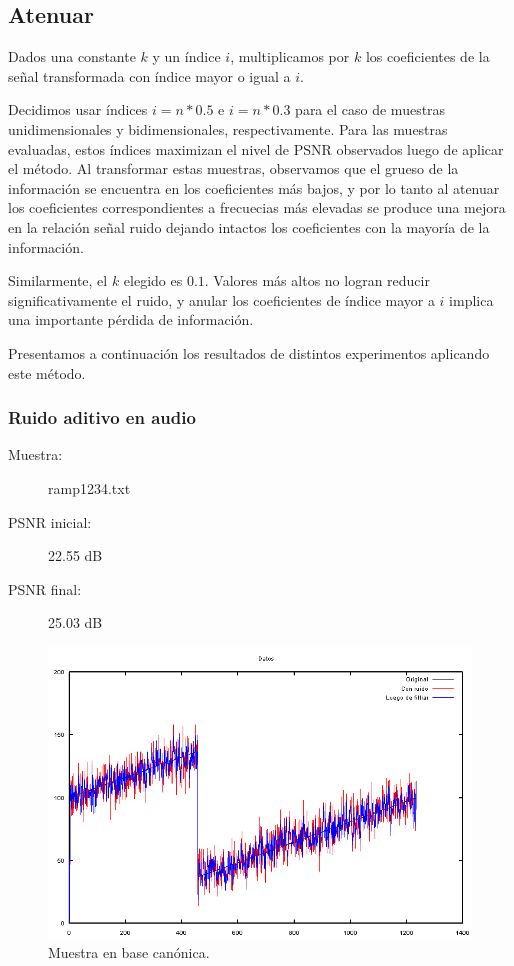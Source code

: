 \documentclass[a4paper,10pt,twoside]{article}
\begin{document}
\subsection{Atenuar}

Dados una constante $k$ y un índice $i$, multiplicamos por $k$ los coeficientes de la señal transformada con índice mayor o igual a $i$.

Decidimos usar índices $i = n * 0.5$ e $i = n * 0.3$ para el caso de muestras unidimensionales y bidimensionales, respectivamente. Para las muestras evaluadas, estos índices maximizan el nivel de PSNR observados luego de aplicar el método. Al transformar estas muestras, observamos que el grueso de la información se encuentra en los coeficientes más bajos, y por lo tanto al atenuar los coeficientes correspondientes a frecuecias más elevadas se produce una mejora en la relación señal ruido dejando intactos los coeficientes con la mayoría de la información.

Similarmente, el $k$ elegido es $0.1$. Valores más altos no logran reducir significativamente el ruido, y anular los coeficientes de índice mayor a $i$ implica una importante pérdida de información.

Presentamos a continuación los resultados de distintos experimentos aplicando este método.

\subsubsection{Ruido aditivo en audio}

\begin{description}
  \item[Muestra:] ramp1234.txt
  \item[PSNR inicial:] 22.55 dB
  \item[PSNR final:] 25.03 dB
\end{description}

\begin{figure}[H]
  \centering
  \includegraphics[width=15cm]{graficos/ramp_aditivo_atenuar_muestra.png}
  \caption{Muestra en base canónica.}
\end{figure}
\end{document}
